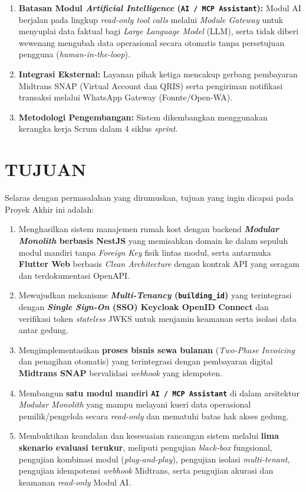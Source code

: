 \begin{enumerate}[label=\arabic*., leftmargin=*]
  \item \textbf{Batasan Modul \textit{Artificial Intelligence} (\texttt{AI / MCP Assistant}):} Modul AI berjalan pada lingkup \textit{read-only tool calls} melalui \textit{Module Gateway} untuk menyuplai data faktual bagi \textit{Large Language Model} (LLM), serta tidak diberi wewenang mengubah data operasional secara otomatis tanpa persetujuan pengguna (\textit{human-in-the-loop}).
  \item \textbf{Integrasi Eksternal:} Layanan pihak ketiga mencakup gerbang pembayaran Midtrans SNAP (Virtual Account dan QRIS) serta pengiriman notifikasi transaksi melalui WhatsApp Gateway (Fonnte/Open-WA).
  \item \textbf{Metodologi Pengembangan:} Sistem dikembangkan menggunakan kerangka kerja Scrum dalam 4 siklus \textit{sprint}.
\end{enumerate}
\fi

\section{TUJUAN}

Selaras dengan permasalahan yang dirumuskan, tujuan yang ingin dicapai pada Proyek Akhir ini adalah:
\begin{enumerate}[label=\arabic*., leftmargin=*]
  \item Menghasilkan sistem manajemen rumah kost dengan backend \textbf{\textit{Modular Monolith} berbasis NestJS} yang memisahkan domain ke dalam sepuluh modul mandiri tanpa \textit{Foreign Key} fisik lintas modul, serta antarmuka \textbf{Flutter Web} berbasis \textit{Clean Architecture} dengan kontrak API yang seragam dan terdokumentasi OpenAPI.
  \item Mewujudkan mekanisme \textbf{\textit{Multi-Tenancy} (\texttt{building\_id})} yang terintegrasi dengan \textbf{\textit{Single Sign-On} (SSO) Keycloak OpenID Connect} dan verifikasi token \textit{stateless} JWKS untuk menjamin keamanan serta isolasi data antar gedung.
  \item Mengimplementasikan \textbf{proses bisnis sewa bulanan} (\textit{Two-Phase Invoicing} dan penagihan otomatis) yang terintegrasi dengan pembayaran digital \textbf{Midtrans SNAP} bervalidasi \textit{webhook} yang idempoten.
  \item Membangun \textbf{satu modul mandiri \texttt{AI / MCP Assistant}} di dalam arsitektur \textit{Modular Monolith} yang mampu melayani kueri data operasional pemilik/pengelola secara \textit{read-only} dan mematuhi batas hak akses gedung.
  \item Membuktikan keandalan dan kesesuaian rancangan sistem melalui \textbf{lima skenario evaluasi terukur}, meliputi pengujian \textit{black-box} fungsional, pengujian kombinasi modul (\textit{plug-and-play}), pengujian isolasi \textit{multi-tenant}, pengujian idempotensi \textit{webhook} Midtrans, serta pengujian akurasi dan keamanan \textit{read-only} Modul AI.
\end{enumerate}

